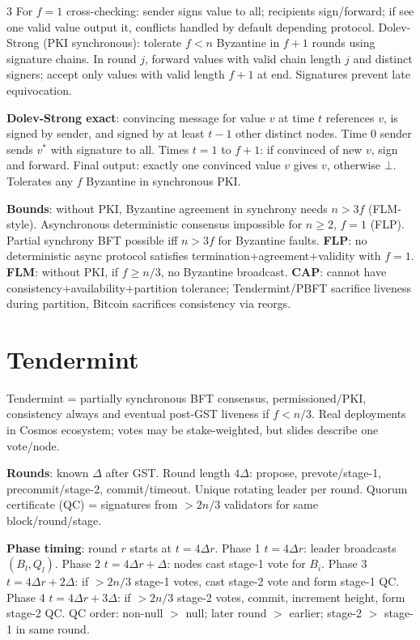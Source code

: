 \documentclass[8pt]{extarticle}
\newcommand{\term}[1]{\textbf{#1}}
\begin{document}
\begin{multicols*}{3}
For $f=1$ cross-checking: sender signs value to all; recipients sign/forward; if see one valid value output it, conflicts handled by default depending protocol. Dolev-Strong (PKI synchronous): tolerate $f<n$ Byzantine in $f+1$ rounds using signature chains. In round $j$, forward values with valid chain length $j$ and distinct signers; accept only values with valid length $f+1$ at end. Signatures prevent late equivocation.

\term{Dolev-Strong exact}: convincing message for value $v$ at time $t$ references $v$, is signed by sender, and signed by at least $t-1$ other distinct nodes. Time 0 sender sends $v^*$ with signature to all. Times $t=1$ to $f+1$: if convinced of new $v$, sign and forward. Final output: exactly one convinced value $v$ gives $v$, otherwise $\bot$. Tolerates any $f$ Byzantine in synchronous PKI.

\term{Bounds}: without PKI, Byzantine agreement in synchrony needs $n>3f$ (FLM-style). Asynchronous deterministic consensus impossible for $n\ge2$, $f=1$ (FLP). Partial synchrony BFT possible iff $n>3f$ for Byzantine faults. \term{FLP}: no deterministic async protocol satisfies termination+agreement+validity with $f=1$. \term{FLM}: without PKI, if $f\ge n/3$, no Byzantine broadcast. \term{CAP}: cannot have consistency+availability+partition tolerance; Tendermint/PBFT sacrifice liveness during partition, Bitcoin sacrifices consistency via reorgs.

\section{Tendermint}
Tendermint = partially synchronous BFT consensus, permissioned/PKI, consistency always and eventual post-GST liveness if $f<n/3$. Real deployments in Cosmos ecosystem; votes may be stake-weighted, but slides describe one vote/node.

\term{Rounds}: known $\Delta$ after GST. Round length $4\Delta$: propose, prevote/stage-1, precommit/stage-2, commit/timeout. Unique rotating leader per round. Quorum certificate (QC) = signatures from $>2n/3$ validators for same block/round/stage.

\term{Phase timing}: round $r$ starts at $t=4\Delta r$. Phase 1 $t=4\Delta r$: leader broadcasts $(B_l,Q_l)$. Phase 2 $t=4\Delta r+\Delta$: nodes cast stage-1 vote for $B_i$. Phase 3 $t=4\Delta r+2\Delta$: if $>2n/3$ stage-1 votes, cast stage-2 vote and form stage-1 QC. Phase 4 $t=4\Delta r+3\Delta$: if $>2n/3$ stage-2 votes, commit, increment height, form stage-2 QC. QC order: non-null $>$ null; later round $>$ earlier; stage-2 $>$ stage-1 in same round.


\end{multicols*}
\end{document}
